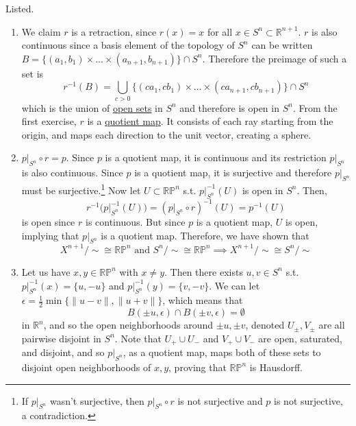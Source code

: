   \begin{solution}
    Listed. 
    \begin{enumerate}
      \item We claim $r$ is a retraction, since $r(x) = x$ for all $x \in S^n \subset \mathbb{R}^{n+1}$. $r$ is also continuous since a basis element of the topology of $S^n$ can be written $B = \big\{(a_1, b_1) \times \ldots \times (a_{n+1}, b_{n+1}) \big\} \cap S^n$. Therefore the preimage of such a set is 
      \begin{equation}
        r^{-1} (B) = \bigcup_{c > 0} \big\{(c a_1, c b_1) \times \ldots \times (c a_{n+1}, c b_{n+1}) \big\} \cap S^n 
      \end{equation}
      which is the union of \hyperref[def:open-set]{open sets} in $S^n$ and therefore is open in $S^n$. From the first exercise, $r$ is a \hyperref[def:quotient-map]{quotient map}. It consists of each ray starting from the origin, and maps each direction to the unit vector, creating a sphere.   


      \item $p|_{S^n} \circ r = p$. Since $p$ is a quotient map, it is continuous and its restriction $p|_{S^n}$ is also continuous. Since $p$ is a quotient map, it is surjective and therefore $p|_{S^n}$ must be surjective.\footnote{If $p|_{S^n}$ wasn't surjective, then $p|_{S^n} \circ r$ is not surjective and $p$ is not surjective, a contradiction. } Now let $U \subset \mathbb{RP}^n$ s.t. $p|_{S^n}^{-1} (U)$ is open in $S^n$. Then, 
      \begin{equation}
        r^{-1} \big( p|_{S^n}^{-1} (U) \big) = (p |_{S^n} \circ r)^{-1} (U) = p^{-1} (U)
      \end{equation} 
      is open since $r$ is continuous. But since $p$ is a quotient map, $U$ is open, implying that $p|_{S^n}$ is a quotient map. Therefore, we have shown that 
      \begin{equation}
        X^{n+1} / \sim \cong \mathbb{RP}^n \text{ and } S^n / \sim \cong \mathbb{RP}^n \implies X^{n+1} / \sim \cong S^n / \sim
      \end{equation}

      \item Let us have $x, y \in \mathbb{RP}^n$ with $x \neq y$. Then there exists $u, v \in S^n$ s.t. $p|_{S^n}^{-1}(x) = \{u, -u\}$ and $p|_{S^n}^{-1} (y) = \{v, -v\}$. We can let $\epsilon = \frac{1}{2} \min\{ \|u - v\|, \|u + v\|\}$, which means that 
      \begin{equation}
        B(\pm u, \epsilon) \cap B(\pm v, \epsilon) = \emptyset 
      \end{equation}
      in $\mathbb{R}^n$, and so the open neighborhoods around $\pm u, \pm v$, denoted $U_{\pm}, V_{\pm}$ are all pairwise disjoint in $S^n$. Note that $U_+ \cup U_-$ and $V_+ \cup V_-$ are open, saturated, and disjoint, and so $p|_{S^n}$, as a quotient map, maps both of these sets to disjoint open neighborhoods of $x, y$, proving that $\mathbb{RP}^n$ is Hausdorff. 


\end{enumerate}
\end{solution}

